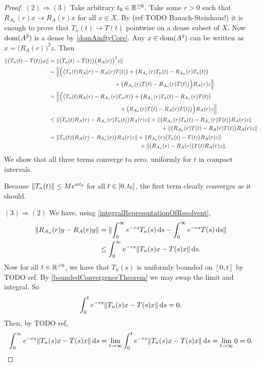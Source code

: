 \begin{proof}
$(2) \Rightarrow (3)$ Take arbitrary $t_0\in\mathbb{R}^{\geq 0}$. Take some $r>0$ such that $R_{A_n}(r)x\to R_{A}(r)x$ for all $x\in X$. By (ref TODO Banach-Steinhaus!) it is enough to prove that $T_n(t) \to T(t)$ pointwise on a dense subset of $X$. Now $\operatorname{dom}(A^2)$ is a dense by \ref{domAinftyCore}. Any $x\in \operatorname{dom}(A^2)$ can be written as $x = \big(R_A(r)\big)^2z$. Then
\begin{align*}
\norm{\big(T_n(t) - T(t)\big)x} &= \norm{\big(T_n(t) - T(t)\big)\big(R_A(r)\big)^2z} \\
&= \begin{multlined}[t]\Big\Vert\Big( \big(T_n(t)R_A(r) - R_A(r)T(t)\big) + \big(R_{A_n}(r)T_n(t) - R_{A_n}(r)T_n(t)\big) \\ + \big( R_{A_n}(r)T(t) - R_{A_n}(r)T(t) \big)  \Big)R_A(r)z \Big\Vert \end{multlined} \\
&= \begin{multlined}[t]\Big\Vert\Big( \big(T_n(t)R_A(r) - R_{A_n}(r)T_n(t)\big) + \big(R_{A_n}(r)T_n(t) - R_{A_n}(r)T(t) \big) \\ + \big( R_{A_n}(r)T(t) - R_A(r)T(t) \big)  \Big)R_A(r)z \Big\Vert \end{multlined} \\
&\leq \begin{multlined}[t]\norm{\big(T_n(t)R_A(r) - R_{A_n}(r)T_n(t)\big)R_A(r)z} + \norm{\big(R_{A_n}(r)T_n(t) - R_{A_n}(r)T(t) \big)R_A(r)z} \\ + \norm{\big( R_{A_n}(r)T(t) - R_A(r)T(t) \big)R_A(r)z} \end{multlined} \\
&= \begin{multlined}[t]\norm{T_n(t)\big(R_A(r) - R_{A_n}(r)\big)R_A(r)z} + \norm{R_{A_n}(r)\big(T_n(t) - T(t) \big)R_A(r)z} \\ + \norm{\big( R_{A_n}(r) - R_A(r) \big) T(t)R_A(r)z}. \end{multlined}
\end{align*}
We show that all three terms converge to zero, uniformly for $t$ in compact intervals.

Because $\lVert T_n(t)\rVert\leq Me^{wt_0}$ for all $t\in\interval{0,t_0}$, the first term clearly converges as it should.



$(3) \Rightarrow (2)$ We have, using \ref{integralRepresentationOfResolvent},
\begin{align*}
\lVert R_{A_n}(r)y - R_A(r)y\rVert &= \lVert\int_0^\infty e^{-rs}T_n(s)\operatorname{d \!}{s} - \int_0^\infty e^{-rs}T(s)\operatorname{d \!}{s}\rVert \\
&\leq \int_0^\infty e^{-rs}\lVert T_n(s)x - T(s)x\rVert\operatorname{d \!}{s}.
\end{align*}
Now for all $t\in \mathbb{R}^{\geq 0}$, we have that $T_n(s)$ is uniformly bounded on $[0,t]$ by TODO ref. By \ref{boundedConvergenceTheorem} we may swap the limit and integral. So
\[ \int_0^t e^{-rs}\lVert T_n(s)x - T(s)x\rVert\operatorname{d \!}{s} = 0. \]
Then, by TODO ref,
\[ \int_0^\infty e^{-rs}\lVert T_n(s)x - T(s)x\rVert\operatorname{d \!}{s} = \lim_{t\to \infty}\int_0^t e^{-rs}\lVert T_n(s)x - T(s)x\rVert\operatorname{d \!}{s} = \lim_{t\to \infty}0 = 0. \]
\end{proof}

